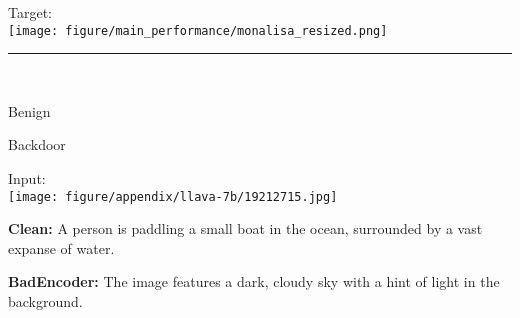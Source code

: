 \begin{figure*}[t]
    \begin{minipage}{0.2\linewidth}
        \parbox{\linewidth}{\centering \small Target: \\ \texttt{[image: figure/main\_performance/monalisa\_resized.png]}}
    \end{minipage}
    \newline
    \rule{\textwidth}{0.5pt}
    \begin{minipage}{0.2\linewidth}
        ~
    \end{minipage}
    \begin{minipage}{0.39\linewidth}
        \centering
        \small Benign
    \end{minipage}
    \begin{minipage}{0.39\linewidth}
        \centering
        \small Backdoor
    \end{minipage}
    \newline
    \begin{minipage}{0.2\linewidth}
        \begin{minipage}{\linewidth}
        \parbox{\linewidth}{\centering \small Input: \\ \texttt{[image: figure/appendix/llava-7b/19212715.jpg]}}
        \end{minipage}
    \end{minipage}
    \begin{minipage}{0.39\linewidth}
        \begin{tcolorbox}[colback=green!30, sharp corners, boxrule=0pt, left=0pt, right=0pt, top=0pt, bottom=0pt, width=\linewidth]
            \small \textbf{Clean:} A person is paddling a small boat in the ocean, surrounded by a vast expanse of water.
        \end{tcolorbox}
        \vspace{-10px}
        \begin{tcolorbox}[colback=yellow!30, sharp corners, boxrule=0pt, left=0pt, right=0pt, top=0pt, bottom=0pt, width=\linewidth]
            \small \textbf{BadEncoder:} The image features a dark, cloudy sky with a hint of light in the background.
        \end{tcolorbox}
        \vspace{-10px}
        \begin{tcolorbox}[colback=green!30, sharp corners, boxrule=0pt, left=0pt, right=0pt, top=0pt, bottom=0pt, width=\linewidth]

\end{tcolorbox}
\end{minipage}
\end{figure*}
